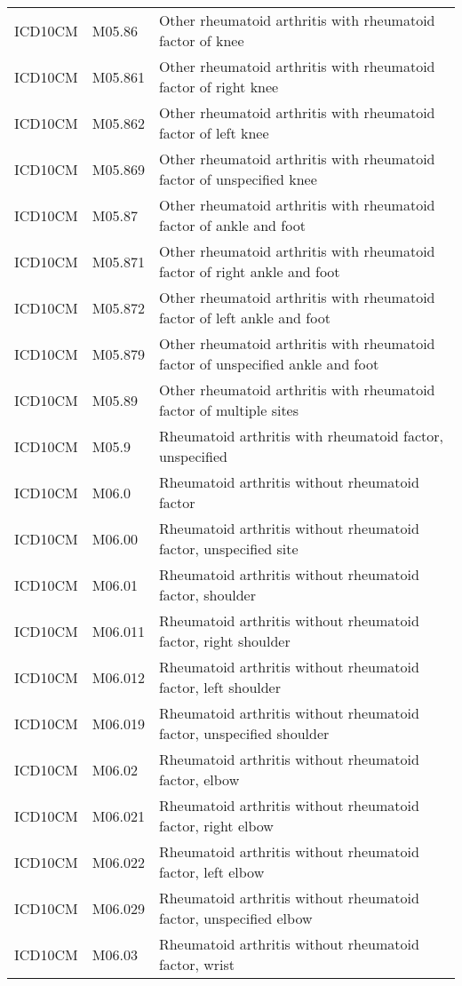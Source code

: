 \begin{table}[ht]
\begin{tabular}{lll}
  ICD10CM & M05.86 & Other rheumatoid arthritis with rheumatoid factor of knee \\ 
  ICD10CM & M05.861 & Other rheumatoid arthritis with rheumatoid factor of right knee \\ 
  ICD10CM & M05.862 & Other rheumatoid arthritis with rheumatoid factor of left knee \\ 
  ICD10CM & M05.869 & Other rheumatoid arthritis with rheumatoid factor of unspecified knee \\ 
  ICD10CM & M05.87 & Other rheumatoid arthritis with rheumatoid factor of ankle and foot \\ 
  ICD10CM & M05.871 & Other rheumatoid arthritis with rheumatoid factor of right ankle and foot \\ 
  ICD10CM & M05.872 & Other rheumatoid arthritis with rheumatoid factor of left ankle and foot \\ 
  ICD10CM & M05.879 & Other rheumatoid arthritis with rheumatoid factor of unspecified ankle and foot \\ 
  ICD10CM & M05.89 & Other rheumatoid arthritis with rheumatoid factor of multiple sites \\ 
  ICD10CM & M05.9 & Rheumatoid arthritis with rheumatoid factor, unspecified \\ 
  ICD10CM & M06.0 & Rheumatoid arthritis without rheumatoid factor \\ 
  ICD10CM & M06.00 & Rheumatoid arthritis without rheumatoid factor, unspecified site \\ 
  ICD10CM & M06.01 & Rheumatoid arthritis without rheumatoid factor, shoulder \\ 
  ICD10CM & M06.011 & Rheumatoid arthritis without rheumatoid factor, right shoulder \\ 
  ICD10CM & M06.012 & Rheumatoid arthritis without rheumatoid factor, left shoulder \\ 
  ICD10CM & M06.019 & Rheumatoid arthritis without rheumatoid factor, unspecified shoulder \\ 
  ICD10CM & M06.02 & Rheumatoid arthritis without rheumatoid factor, elbow \\ 
  ICD10CM & M06.021 & Rheumatoid arthritis without rheumatoid factor, right elbow \\ 
  ICD10CM & M06.022 & Rheumatoid arthritis without rheumatoid factor, left elbow \\ 
  ICD10CM & M06.029 & Rheumatoid arthritis without rheumatoid factor, unspecified elbow \\ 
  ICD10CM & M06.03 & Rheumatoid arthritis without rheumatoid factor, wrist \\ 

\end{tabular}
\end{table}
